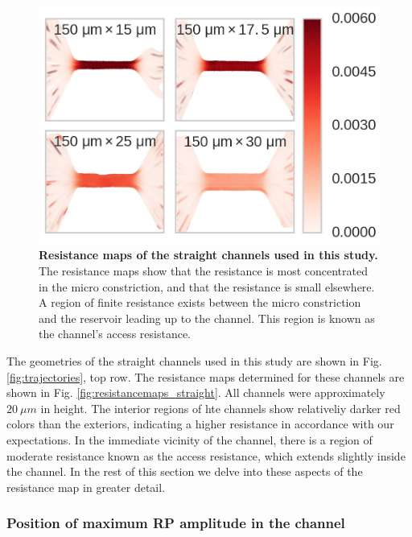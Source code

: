 			\begin{figure}
				\includegraphics[width=\textwidth]{resistancemaps_straight}
				\caption{\textbf{Resistance maps of the straight channels used in this study.} The resistance maps show that the resistance is most concentrated in the micro constriction, and that the resistance is small elsewhere. A region of finite resistance exists between the micro constriction and the reservoir leading up to the channel. This region is known as the channel's access resistance.}
			\end{figure}

		
			The geometries of the straight channels used in this study are shown in Fig. \ref{fig:trajectories}, top row. The resistance maps determined for these channels are shown in Fig. \ref{fig:resistancemaps_straight}. All channels were approximately $\SI{20}{\mu m}$ in height. The interior regions of hte channels show relativeliy darker red colors than the exteriors, indicating a higher resistance in accordance with our expectations. In the immediate vicinity of the channel, there is a region of moderate resistance known as the access resistance, which extends slightly inside the channel. In the rest of this section we delve into these aspects of the resistance map in greater detail.
			
			
			\subsubsection{Position of maximum RP amplitude in the channel}
			
